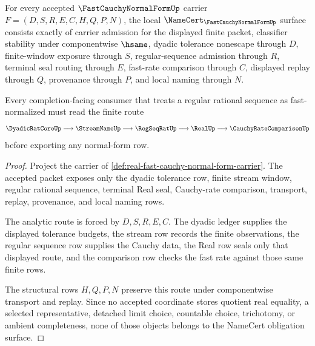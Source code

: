 \begin{theorem}
\label{thm:real-fast-cauchy-normal-form-namecert-obligations}
For every accepted $\FastCauchyNormalFormUp$ carrier $F=(D,S,R,E,C,H,Q,P,N)$, the local $\NameCert_{\FastCauchyNormalFormUp}$ surface consists exactly of carrier admission for the displayed finite packet, classifier stability under componentwise $\hsame$, dyadic tolerance nonescape through $D$, finite-window exposure through $S$, regular-sequence admission through $R$, terminal seal routing through $E$, fast-rate comparison through $C$, displayed replay through $Q$, provenance through $P$, and local naming through $N$.

Every completion-facing consumer that treats a regular rational sequence as fast-normalized must read the finite route
$$
\DyadicRatCoreUp \longrightarrow \StreamNameUp \longrightarrow \RegSeqRatUp \longrightarrow \RealUp \longrightarrow \CauchyRateComparisonUp
$$
before exporting any normal-form row.
\end{theorem}
\begin{proof}
Project the carrier of \autoref{def:real-fast-cauchy-normal-form-carrier}. The accepted packet exposes only the dyadic tolerance row, finite stream window, regular rational sequence, terminal Real seal, Cauchy-rate comparison, transport, replay, provenance, and local naming rows.

The analytic route is forced by $D,S,R,E,C$. The dyadic ledger supplies the displayed tolerance budgets, the stream row records the finite observations, the regular sequence row supplies the Cauchy data, the Real row seals only that displayed route, and the comparison row checks the fast rate against those same finite rows.

The structural rows $H,Q,P,N$ preserve this route under componentwise transport and replay. Since no accepted coordinate stores quotient real equality, a selected representative, detached limit choice, countable choice, trichotomy, or ambient completeness, none of those objects belongs to the NameCert obligation surface.
\end{proof}


